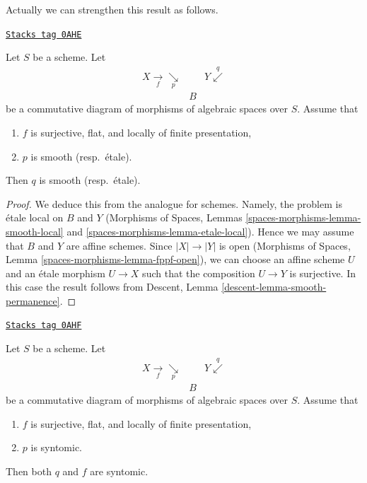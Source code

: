 Actually we can strengthen this result as follows.

\begin{lemma}
\label{spaces-descent-lemma-smooth-permanence}
\href{https://stacks.math.columbia.edu/tag/0AHE}{\texttt{Stacks tag 0AHE}}

Let $S$ be a scheme. Let
$$
\begin{array}{ccc}X \underset{f}{\longrightarrow}\underset{p}{\searrow} &  & Y \overset{q}{\swarrow} \\  & B & \end{array}
$$
be a commutative diagram of morphisms of algebraic spaces over $S$. Assume that
\begin{enumerate}
\item $f$ is surjective, flat, and locally of finite presentation,
\item $p$ is smooth (resp.\ \'etale).
\end{enumerate}
Then $q$ is smooth (resp.\ \'etale).
\end{lemma}

\begin{proof}
We deduce this from the analogue for schemes.
Namely, the problem is \'etale local on $B$ and $Y$
(Morphisms of Spaces, Lemmas
\ref{spaces-morphisms-lemma-smooth-local} and
\ref{spaces-morphisms-lemma-etale-local}).
Hence we may assume that $B$ and $Y$ are affine
schemes. Since $|X| \to |Y|$ is open
(Morphisms of Spaces, Lemma \ref{spaces-morphisms-lemma-fppf-open}),
we can choose an affine
scheme $U$ and an \'etale morphism $U \to X$ such that the
composition $U \to Y$ is surjective. In this case the result
follows from Descent, Lemma
\ref{descent-lemma-smooth-permanence}.
\end{proof}

\begin{lemma}
\label{spaces-descent-lemma-syntomic-permanence}
\href{https://stacks.math.columbia.edu/tag/0AHF}{\texttt{Stacks tag 0AHF}}

Let $S$ be a scheme. Let
$$
\begin{array}{ccc}X \underset{f}{\longrightarrow}\underset{p}{\searrow} &  & Y \overset{q}{\swarrow} \\  & B & \end{array}
$$
be a commutative diagram of morphisms of algebraic spaces over $S$. Assume that
\begin{enumerate}
\item $f$ is surjective, flat, and locally of finite presentation,
\item $p$ is syntomic.
\end{enumerate}
Then both $q$ and $f$ are syntomic.
\end{lemma}

